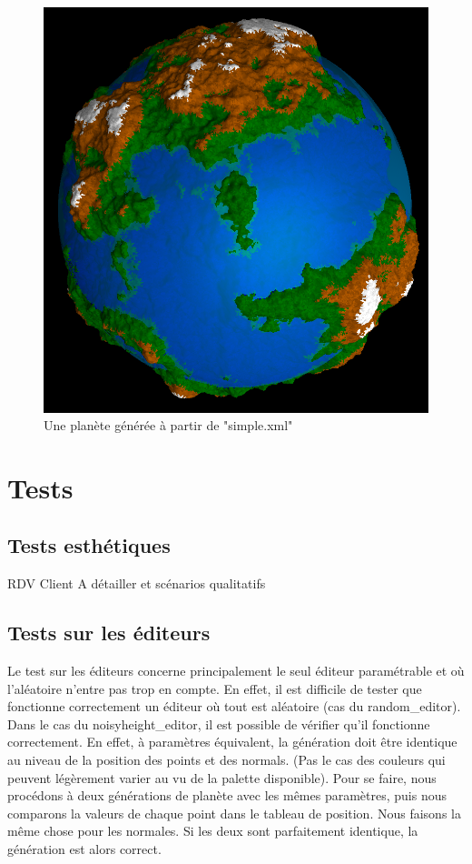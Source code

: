 \documentclass[a4paper]{article}
\begin{document}
\begin{figure}[!h]
    \begin{center}
        \includegraphics[width=0.6\linewidth]{img/notre_planete.png} 
        \caption{Une planète générée à partir de "simple.xml"}
        \label{notre_planete}
    \end{center}
\end{figure}


\newpage 
\section{Tests}


\subsection{Tests esthétiques}

RDV Client A détailler et scénarios qualitatifs

\subsection{Tests sur les éditeurs}

Le test sur les éditeurs concerne principalement le seul éditeur paramétrable et où l'aléatoire n'entre pas trop en compte. En effet, il est difficile de tester que fonctionne correctement un éditeur où tout est aléatoire (cas du random\_editor). Dans le cas du noisyheight\_editor, il est possible de vérifier qu'il fonctionne correctement. En effet, à paramètres équivalent, la génération doit être identique au niveau de la position des points et des normals. (Pas le cas des couleurs qui peuvent légèrement varier au vu de la palette disponible). Pour se faire, nous procédons à deux générations de planète avec les mêmes paramètres, puis nous comparons la valeurs de chaque point dans le tableau de position. Nous faisons la même chose pour les normales. Si les deux sont parfaitement identique, la génération est alors correct.
\end{document}

